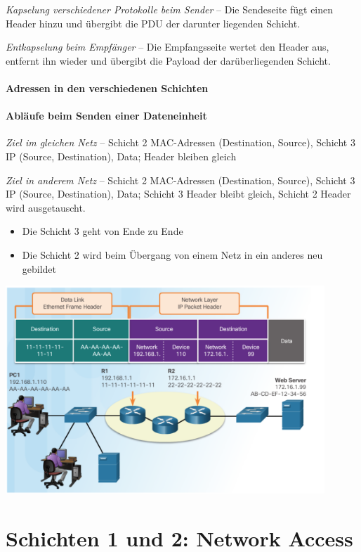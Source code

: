 \documentclass[a4paper,12pt]{article}
\begin{document}
\emph{Kapselung verschiedener Protokolle beim Sender} -- Die Sendeseite fügt einen Header hinzu und übergibt die PDU der darunter liegenden Schicht.

\emph{Entkapselung beim Empfänger} -- Die Empfangsseite wertet den Header aus, entfernt ihn wieder und übergibt die Payload der darüberliegenden Schicht.

\paragraph{Adressen in den verschiedenen Schichten}

\paragraph{Abläufe beim Senden einer Dateneinheit}
\emph{Ziel im gleichen Netz} -- Schicht 2 MAC-Adressen (Destination, Source), Schicht 3 IP (Source, Destination), Data; Header bleiben gleich

\emph{Ziel in anderem Netz} -- Schicht 2 MAC-Adressen (Destination, Source), Schicht 3 IP (Source, Destination), Data; Schicht 3 Header bleibt gleich, Schicht 2 Header wird ausgetauscht.

\begin{itemize}
\item Die Schicht 3 geht von Ende zu Ende
\item Die Schicht 2 wird beim Übergang von einem Netz in ein anderes neu gebildet
\end{itemize}

\begin{center}
\includegraphics[width=12cm]{img/02_transport_data.png}
\end{center}

\newpage
\section{Schichten 1 und 2: Network Access}
\end{document}
